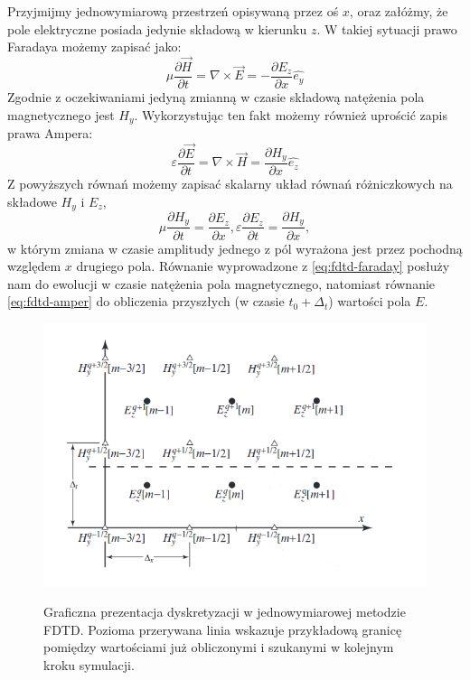 Przyjmijmy jednowymiarową przestrzeń opisywaną przez oś $x$, oraz załóżmy, że pole elektryczne posiada jedynie składową w kierunku $z$. W takiej sytuacji prawo Faradaya możemy zapisać jako:
\begin{equation}
\mu \frac{\partial \vec{H}}{\partial t}= \nabla \times \vec{E} = - \frac{\partial E_z}{\partial x} \hat{e_y}
\label{eq:fdtd-faraday}
\end{equation}
Zgodnie z oczekiwaniami jedyną zmianną w czasie składową natężenia pola magnetycznego jest $H_y$. Wykorzystując ten fakt możemy również uprościć zapis prawa Ampera:
\begin{equation}
\varepsilon \frac{\partial \vec{E}}{\partial t}=\nabla \times \vec{H} = \frac{\partial H_y}{\partial x} \hat{e_z}
\label{eq:fdtd-amper}
\end{equation}
Z powyższych równań możemy zapisać  skalarny układ równań różniczkowych na składowe $H_y$ i $E_z$,
\begin{equation}
\mu \frac{\partial H_y}{\partial t}=\frac{\partial E_z}{\partial x} ,
\varepsilon \frac{\partial E_z}{\partial t}=\frac{\partial H_y}{\partial x},
\end{equation} w którym zmiana w czasie amplitudy jednego z pól wyrażona jest przez pochodną względem $x$ drugiego pola. Równanie wyprowadzone z \ref{eq:fdtd-faraday} posłuży nam do ewolucji w czasie natężenia pola magnetycznego, natomiast równanie \ref{eq:fdtd-amper} do obliczenia przyszłych (w czasie $t_0 + \Delta_t$) wartości pola $E$.

\begin{figure}[tb]
\includegraphics[width=.9\textwidth]{subart/fdtd/leapfrog.png}
\label{pic:leapfrog}
\caption{Graficzna prezentacja dyskretyzacji w jednowymiarowej metodzie FDTD. Pozioma przerywana linia wskazuje przykładową granicę pomiędzy wartościami już obliczonymi i szukanymi w kolejnym kroku symulacji. }
\end{figure}


